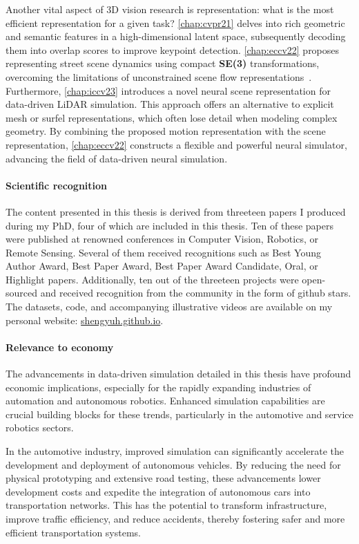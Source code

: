 Another vital aspect of 3D vision research is representation: what is the most efficient representation for a given task? \cref{chap:cvpr21} delves into rich geometric and semantic features in a high-dimensional latent space, subsequently decoding them into overlap scores to improve keypoint detection. \cref{chap:eccv22} proposes representing street scene dynamics using compact \textbf{SE(3)} transformations, overcoming the limitations of unconstrained scene flow representations~\cite{wu2019pointpwc}. Furthermore, \cref{chap:iccv23} introduces a novel neural scene representation for data-driven LiDAR simulation. This approach offers an alternative to explicit mesh or surfel representations, which often lose detail when modeling complex geometry. By combining the proposed motion representation with the scene representation, \cref{chap:eccv22} constructs a flexible and powerful neural simulator, advancing the field of data-driven neural simulation.


\paragraph{Scientific recognition}
The content presented in this thesis is derived from threeteen papers I produced during my PhD, four of which are included in this thesis. Ten of these papers were published at renowned conferences in Computer Vision, Robotics, or Remote Sensing. Several of them received recognitions such as Best Young Author Award, Best Paper Award, Best Paper Award Candidate, Oral, or Highlight papers. Additionally, ten out of the threeteen projects were open-sourced and received recognition from the community in the form of github stars. The datasets, code, and accompanying illustrative videos are available on my personal website: \url{shengyuh.github.io}.

\paragraph{Relevance to economy}
The advancements in data-driven simulation detailed in this thesis have profound economic implications, especially for the rapidly expanding industries of automation and autonomous robotics. Enhanced simulation capabilities are crucial building blocks for these trends, particularly in the automotive and service robotics sectors.

In the automotive industry, improved simulation can significantly accelerate the development and deployment of autonomous vehicles. By reducing the need for physical prototyping and extensive road testing, these advancements lower development costs and expedite the integration of autonomous cars into transportation networks. This has the potential to transform infrastructure, improve traffic efficiency, and reduce accidents, thereby fostering safer and more efficient transportation systems.

